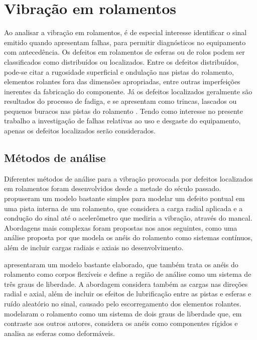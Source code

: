 \documentclass[12pt,oneside,english,brazil,lmodern,siglas,simbolos,cite=num]{ucsmonograph}
\begin{document}
	\section{Vibração em rolamentos}
	Ao analisar a vibração em rolamentos, é de especial interesse identificar o sinal emitido quando apresentam falhas, para permitir diagnósticos no equipamento com antecedência.
	Os defeitos em rolamentos de esferas ou de rolos podem ser classificados como distribuídos ou localizados.
	Entre os defeitos distribuídos, pode-se citar a rugosidade superficial e ondulação nas pistas do rolamento, elementos rolantes fora das dimensões apropriadas, entre outras imperfeições inerentes da fabricação do componente.
	Já os defeitos localizados geralmente são resultados do processo de fadiga, e se apresentam como trincas, lascados ou pequenos buracos nas pistas do rolamento \cite{tandon:1997,sassi:2007}.
	Tendo como interesse no presente trabalho a investigação de falhas relativas ao uso e desgaste do equipamento, apenas os defeitos localizados serão considerados.
	
	\subsection{Métodos de análise}
	Diferentes métodos de análise para a vibração provocada por defeitos localizados em rolamentos foram desenvolvidos desde a metade do século passado.
	\citeauthor{mcfadden:1984} propuseram um modelo bastante simples para modelar um defeito pontual em uma pista interna de um rolamento, que considera a carga radial aplicada e a condução do sinal até o acelerômetro que mediria a vibração, através do mancal.
	Abordagens mais complexas foram propostas nos anos seguintes, como uma análise proposta por \citeauthor{tandon:1997} que modela os anéis do rolamento como sistemas contínuos, além de incluir cargas radiais e axiais no desenvolvimento.
	
	\citeauthor{sassi:2007} apresentaram um modelo bastante elaborado, que também trata os anéis do rolamento como corpos flexíveis e define a região de análise como um sistema de três graus de liberdade.
	A abordagem considera também as cargas nas direções radial e axial, além de incluir os efeitos de lubrificação entre as pistas e esferas e ruído aleatório no sinal, causado pelo escorregamento dos elementos rolantes.	\citeauthor{patil:2010} modelaram o rolamento como um sistema de dois graus de liberdade que, em contraste aos outros autores, considera os anéis como componentes rígidos e analisa as esferas como deformáveis.
	
\end{document}
